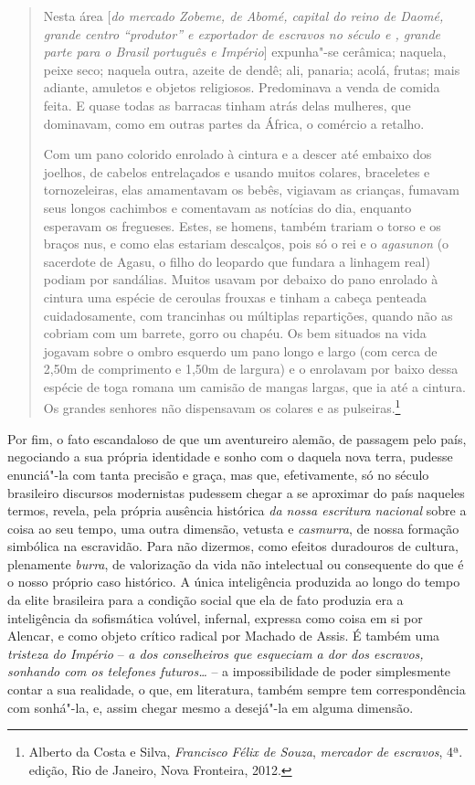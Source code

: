 \begin{quote}
Nesta área {[}\emph{do mercado Zobeme, de Abomé, capital do reino de
Daomé, grande centro ``produtor'' e exportador de escravos no século
 e , grande parte para o Brasil português e Império}{]}
expunha"-se cerâmica; naquela, peixe seco; naquela outra, azeite de
dendê; ali, panaria; acolá, frutas; mais adiante, amuletos e objetos
religiosos. Predominava a venda de comida feita. E quase todas as
barracas tinham atrás delas mulheres, que dominavam, como em outras
partes da África, o comércio a retalho.

Com um pano colorido enrolado
à cintura e a descer até embaixo dos joelhos, de cabelos entrelaçados e
usando muitos colares, braceletes e tornozeleiras, elas amamentavam os
bebês, vigiavam as crianças, fumavam seus longos cachimbos e comentavam
as notícias do dia, enquanto esperavam os fregueses. Estes, se homens,
também trariam o torso e os braços nus, e como elas estariam descalços,
pois só o rei e o \emph{agasunon} (o sacerdote de Agasu, o filho do
leopardo que fundara a linhagem real) podiam por sandálias. Muitos
usavam por debaixo do pano enrolado à cintura uma espécie de ceroulas
frouxas e tinham a cabeça penteada cuidadosamente, com trancinhas ou
múltiplas repartições, quando não as cobriam com um barrete, gorro ou
chapéu. Os bem situados na vida jogavam sobre o ombro esquerdo um pano
longo e largo (com cerca de 2,50m de comprimento e 1,50m de largura) e o
enrolavam por baixo dessa espécie de toga romana um camisão de mangas
largas, que ia até a cintura. Os grandes senhores não dispensavam os
colares e as pulseiras.\footnote{Alberto da Costa e Silva,
  \emph{Francisco Félix de Souza}, \emph{mercador de escravos}, 4ª.
  edição, Rio de Janeiro, Nova Fronteira, 2012.}
\end{quote}

Por fim, o fato escandaloso de que um aventureiro alemão, de passagem
pelo país, negociando a sua própria identidade e sonho com o daquela
nova terra, pudesse enunciá"-la com tanta precisão e graça, mas que,
efetivamente, só no século  brasileiro discursos modernistas pudessem
chegar a se aproximar do país naqueles termos, revela, pela própria
ausência histórica \emph{da nossa escritura nacional} sobre a coisa ao
seu tempo, uma outra dimensão, vetusta e \emph{casmurra}, de nossa
formação simbólica na escravidão. Para não dizermos, como efeitos
duradouros de cultura, plenamente \emph{burra}, de valorização da vida
não intelectual ou consequente do que é o nosso próprio caso histórico.
A única inteligência produzida ao longo do tempo da elite brasileira
para a condição social que ela de fato produzia era a inteligência da
sofismática volúvel, infernal, expressa como coisa em si por Alencar, e
como objeto crítico radical por Machado de Assis. É também uma
\emph{tristeza do Império} -- \emph{a dos conselheiros que esqueciam a
dor dos escravos, sonhando com os telefones futuros\ldots{}} -- a
impossibilidade de poder simplesmente contar a sua realidade, o que, em
literatura, também sempre tem correspondência com sonhá"-la, e, assim
chegar mesmo a desejá"-la em alguma dimensão.

